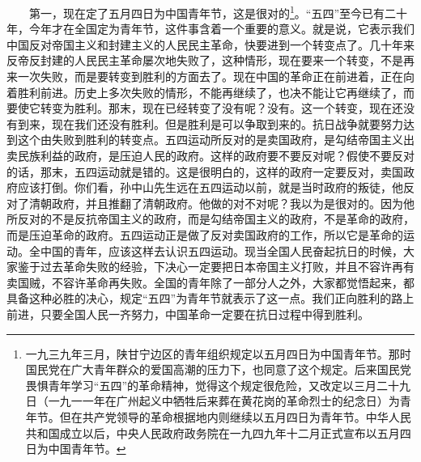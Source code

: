 \documentclass[cn,11pt,chinese]{elegantbook}
\begin{document}
　　第一，现在定了五月四日为中国青年节，这是很对的\footnote[2]{ 一九三九年三月，陕甘宁边区的青年组织规定以五月四日为中国青年节。那时国民党在广大青年群众的爱国高潮的压力下，也同意了这个规定。后来国民党畏惧青年学习“五四”的革命精神，觉得这个规定很危险，又改定以三月二十九日（一九一一年在广州起义中牺牲后来葬在黄花岗的革命烈士的纪念日）为青年节。但在共产党领导的革命根据地内则继续以五月四日为青年节。中华人民共和国成立以后，中央人民政府政务院在一九四九年十二月正式宣布以五月四日为中国青年节。}。“五四”至今已有二十年，今年才在全国定为青年节，这件事含着一个重要的意义。就是说，它表示我们中国反对帝国主义和封建主义的人民民主革命，快要进到一个转变点了。几十年来反帝反封建的人民民主革命屡次地失败了，这种情形，现在要来一个转变，不是再来一次失败，而是要转变到胜利的方面去了。现在中国的革命正在前进着，正在向着胜利前进。历史上多次失败的情形，不能再继续了，也决不能让它再继续了，而要使它转变为胜利。那末，现在已经转变了没有呢？没有。这一个转变，现在还没有到来，现在我们还没有胜利。但是胜利是可以争取到来的。抗日战争就要努力达到这个由失败到胜利的转变点。五四运动所反对的是卖国政府，是勾结帝国主义出卖民族利益的政府，是压迫人民的政府。这样的政府要不要反对呢？假使不要反对的话，那末，五四运动就是错的。这是很明白的，这样的政府一定要反对，卖国政府应该打倒。你们看，孙中山先生远在五四运动以前，就是当时政府的叛徒，他反对了清朝政府，并且推翻了清朝政府。他做的对不对呢？我以为是很对的。因为他所反对的不是反抗帝国主义的政府，而是勾结帝国主义的政府，不是革命的政府，而是压迫革命的政府。五四运动正是做了反对卖国政府的工作，所以它是革命的运动。全中国的青年，应该这样去认识五四运动。现当全国人民奋起抗日的时候，大家鉴于过去革命失败的经验，下决心一定要把日本帝国主义打败，并且不容许再有卖国贼，不容许革命再失败。全国的青年除了一部分人之外，大家都觉悟起来，都具备这种必胜的决心，规定“五四”为青年节就表示了这一点。我们正向胜利的路上前进，只要全国人民一齐努力，中国革命一定要在抗日过程中得到胜利。\\
\end{document}
